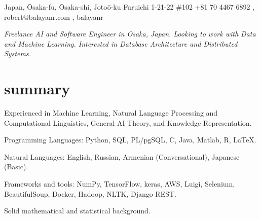 \documentclass[]{cv-roald}
\begin{document}
\pagestyle{empty} %

{\faMapMarker \hspace{\FAspace} Japan, Ōsaka-fu, Ōsaka-shi, Jotoō-ku Furuichi 1-21-22 \#102}
{\faMobile \hspace{\FAspace} +81 70 4467 6892 \sep
\href{mailto:robert@balayanr.com}{\faEnvelope} \hspace{\FAspace} \faSkype\hspace{\FAspace} robert@balayanr.com \sep
\href{https://www.linkedin.com/in/balayanr/}{\faLinkedinSquare} \hspace{\FAspace} \href{https://github.com/balayanr}{\faGithub} \hspace{\FAspace} \href{https://www.facebook.com/balayanr}{\faFacebookSquare} \hspace{\FAspace}\href{https://vk.com/yahhh_gf}{\faVk} \hspace{\FAspace} balayanr \FAspace  %
}
\hypersetup{
    urlcolor=darkermain
}


\textit{Freelance AI and Software Engineer  in Osaka, Japan. Looking to work with Data and Machine Learning. Interested in Database Architecture and Distributed Systems.}

\section*{summary}
\begin{tabitemize}
    \item Experienced in Machine Learning, Natural Language Processing and Computational Linguistics, General AI Theory, and Knowledge Representation.
    \item Programming Languages: Python, SQL, PL/pgSQL, C, Java, Matlab, R, \LaTeX.
    \item Natural Languages: English, Russian, Armenian (Conversational), Japanese (Basic).
    \item Frameworks and tools: NumPy, TensorFlow, keras, AWS, Luigi, Selenium, BeautifulSoup, Docker, Hadoop, NLTK, Django REST.
    \item Solid mathematical and statistical background.
\end{tabitemize}
\end{document}
